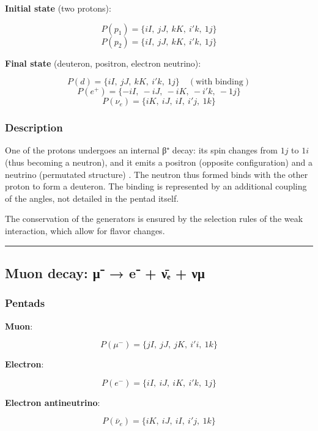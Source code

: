 \documentclass[11pt]{article}
\begin{document}
\textbf{Initial state} (two protons):

\[
P(p_1) = \{ iI,\ jJ,\ kK,\ i'k,\ 1j \}
\] \[
P(p_2) = \{ iI,\ jJ,\ kK,\ i'k,\ 1j \}
\]

\textbf{Final state} (deuteron, positron, electron neutrino):

\[
P(d) = \{ iI,\ jJ,\ kK,\ i'k,\ 1j \} \quad (\text{with binding})
\] \[
P(e^+) = \{ -iI,\ -iJ,\ -iK,\ -i'k,\ -1j \}
\] \[
P(\nu_e) = \{ iK,\ iJ,\ iI,\ i'j,\ 1k \}
\]

\hypertarget{description}{%
\subsubsection{Description}\label{description}}

One of the protons undergoes an internal β⁺ decay: its spin changes from
\(1j\) to \(1i\) (thus becoming a neutron), and it emits a positron
(opposite configuration) and a neutrino (permutated structure) . The
neutron thus formed binds with the other proton to form a deuteron. The
binding is represented by an additional coupling of the angles, not
detailed in the pentad itself.

The conservation of the generators is ensured by the selection rules of
the weak interaction, which allow for flavor changes.

\begin{center}\rule{0.5\linewidth}{0.5pt}\end{center}

\hypertarget{muon-decay-ux3bc-e-ux3bdux2091-ux3bdux3bc}{%
\subsection{Muon decay: μ⁻ → e⁻ + ν̄ₑ +
νμ}\label{muon-decay-ux3bc-e-ux3bdux2091-ux3bdux3bc}}

\hypertarget{pentads-1}{%
\subsubsection{Pentads}\label{pentads-1}}

\textbf{Muon}:

\[
P(\mu^-) = \{ jI,\ jJ,\ jK,\ i'i,\ 1k \}
\]

\textbf{Electron}:

\[
P(e^-) = \{ iI,\ iJ,\ iK,\ i'k,\ 1j \}
\]

\textbf{Electron antineutrino}:

\[
P(\bar{\nu}_e) = \{ iK,\ iJ,\ iI,\ i'j,\ 1k \}
\]
\end{document}
